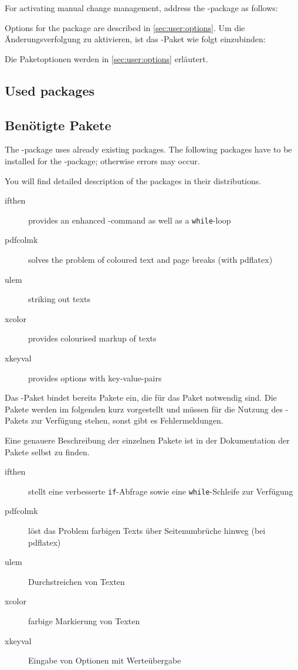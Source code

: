 \ifENGLISH
	For activating manual change management, address the -package as follows:


	Options for the package are described in \autoref{sec:user:options}.
\fi
	\ifGERMAN
		Um die Änderungsverfolgung zu aktivieren, ist das -Paket wie folgt einzubinden:


		Die Paketoptionen werden in \autoref{sec:user:options} erläutert.
	\fi

\ifENGLISH
 \subsection{Used packages}
\fi
	\ifGERMAN
	 \subsection{Benötigte Pakete}
 \fi
\label{sec:user:packages}

\ifENGLISH
 The -package uses already existing packages.
 The following packages have to be installed for the -package; otherwise errors may occur.

 You will find detailed description of the packages in their distributions.
 \begin{description}
	\item [ifthen] provides an enhanced -command as well as a \texttt{while}-loop
	\item [pdfcolmk] solves the problem of coloured text and page breaks (with pdflatex)
	\item [ulem] striking out texts
	\item [xcolor] provides colourised markup of texts
	\item [xkeyval] provides options with key-value-pairs
 \end{description}
\fi
	\ifGERMAN
	 Das -Paket bindet bereits Pakete ein, die für das Paket notwendig sind.
	 Die Pakete werden im folgenden kurz vorgestellt und müssen für die Nutzung des -Pakets zur Verfügung stehen, sonst gibt es Fehlermeldungen.

	 Eine genauere Beschreibung der einzelnen Pakete ist in der Dokumentation der Pakete selbst zu finden.
	 \begin{description}
		\item [ifthen] stellt eine verbesserte \texttt{if}-Abfrage sowie eine \texttt{while}-Schleife zur Verfügung
		\item [pdfcolmk] löst das Problem farbigen Texts über Seitenumbrüche hinweg (bei pdflatex)
		\item [ulem] Durchstreichen von Texten
		\item [xcolor] farbige Markierung von Texten
		\item [xkeyval] Eingabe von Optionen mit Werteübergabe
	 \end{description}
	\fi

